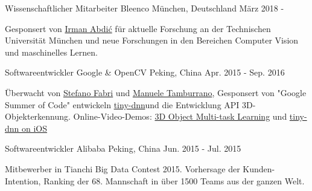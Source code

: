 


\begin{cventries}


\cventry
{Wissenschaftlicher Mitarbeiter} %
{Bleenco} %
{München, Deutschland} %
{März 2018 - } %
{ %
\begin{cvitems}
\item {Gesponsert von \href{https://www.linkedin.com/in/irmanabdic/?originalSubdomain=de}{Irman Abdić} für aktuelle Forschung an der Technischen Universität München und neue Forschungen in den Bereichen Computer Vision und maschinelles Lernen.}
\end{cvitems}
}

\cventry
{Softwareentwickler} %
{Google \& OpenCV} %
{Peking, China} %
{Apr. 2015 - Sep. 2016} %
{ %
\begin{cvitems}
\item {Überwacht von \href{https://www.linkedin.com/in/stefano-fabri-16a73748}{Stefano Fabri} und \href{https://www.linkedin.com/in/manuele-tamburrano-b82384a5?authType=name&authToken=Di5p&trk=prof-sb-browse_map-name}{Manuele Tamburrano}, Gesponsert von "Google Summer of Code" entwickeln \href{https://github.com/tiny-dnn/tiny-dnn}{tiny-dnn}und die Entwicklung API 3D-Objekterkennung. 
Online-Video-Demos: \href{https://www.youtube.com/watch?v=Mc20rTYdXTE}{3D Object Multi-task Learning} und \href{https://drive.google.com/open?id=0B-RYa1FDOrYXVUEzcG1mdnl5a3M}{tiny-dnn on iOS}
}
\end{cvitems}
}


\cventry
{Softwareentwickler} %
{Alibaba} %
{Peking, China} %
{Jun. 2015 - Jul. 2015} %
{ %
\begin{cvitems}
\item {Mitbewerber in Tianchi Big Data Contest 2015. Vorhersage der Kunden-Intention, Ranking der 68. Mannschaft in über 1500 Teams aus der ganzen Welt.}
\end{cvitems}
}


\end{cventries}
